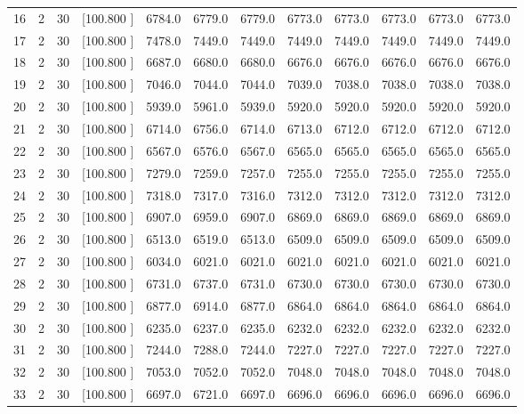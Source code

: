 \documentclass[12pt,a4paper]{article}
\begin{document}
\begin{center}
{\begin{tabular}{r r r r r r r r r r r r}
  16&  2& 30&[100.800   ]&  6784.0&  6779.0&  6779.0&  6773.0&  6773.0&  6773.0&  6773.0&  6773.0\\[-0.02in]
  17&  2& 30&[100.800   ]&  7478.0&  7449.0&  7449.0&  7449.0&  7449.0&  7449.0&  7449.0&  7449.0\\[-0.02in]
  18&  2& 30&[100.800   ]&  6687.0&  6680.0&  6680.0&  6676.0&  6676.0&  6676.0&  6676.0&  6676.0\\[-0.02in]
  19&  2& 30&[100.800   ]&  7046.0&  7044.0&  7044.0&  7039.0&  7038.0&  7038.0&  7038.0&  7038.0\\[-0.02in]
  20&  2& 30&[100.800   ]&  5939.0&  5961.0&  5939.0&  5920.0&  5920.0&  5920.0&  5920.0&  5920.0\\[-0.02in]
  21&  2& 30&[100.800   ]&  6714.0&  6756.0&  6714.0&  6713.0&  6712.0&  6712.0&  6712.0&  6712.0\\[-0.02in]
  22&  2& 30&[100.800   ]&  6567.0&  6576.0&  6567.0&  6565.0&  6565.0&  6565.0&  6565.0&  6565.0\\[-0.02in]
  23&  2& 30&[100.800   ]&  7279.0&  7259.0&  7257.0&  7255.0&  7255.0&  7255.0&  7255.0&  7255.0\\[-0.02in]
  24&  2& 30&[100.800   ]&  7318.0&  7317.0&  7316.0&  7312.0&  7312.0&  7312.0&  7312.0&  7312.0\\[-0.02in]
  25&  2& 30&[100.800   ]&  6907.0&  6959.0&  6907.0&  6869.0&  6869.0&  6869.0&  6869.0&  6869.0\\[-0.02in]
  26&  2& 30&[100.800   ]&  6513.0&  6519.0&  6513.0&  6509.0&  6509.0&  6509.0&  6509.0&  6509.0\\[-0.02in]
  27&  2& 30&[100.800   ]&  6034.0&  6021.0&  6021.0&  6021.0&  6021.0&  6021.0&  6021.0&  6021.0\\[-0.02in]
  28&  2& 30&[100.800   ]&  6731.0&  6737.0&  6731.0&  6730.0&  6730.0&  6730.0&  6730.0&  6730.0\\[-0.02in]
  29&  2& 30&[100.800   ]&  6877.0&  6914.0&  6877.0&  6864.0&  6864.0&  6864.0&  6864.0&  6864.0\\[-0.02in]
  30&  2& 30&[100.800   ]&  6235.0&  6237.0&  6235.0&  6232.0&  6232.0&  6232.0&  6232.0&  6232.0\\[-0.02in]
  31&  2& 30&[100.800   ]&  7244.0&  7288.0&  7244.0&  7227.0&  7227.0&  7227.0&  7227.0&  7227.0\\[-0.02in]
  32&  2& 30&[100.800   ]&  7053.0&  7052.0&  7052.0&  7048.0&  7048.0&  7048.0&  7048.0&  7048.0\\[-0.02in]
  33&  2& 30&[100.800   ]&  6697.0&  6721.0&  6697.0&  6696.0&  6696.0&  6696.0&  6696.0&  6696.0\\[-0.02in]

\end{tabular}}
\end{center}
\end{document}
